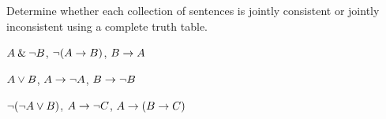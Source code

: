 \problempart
\label{pr.TT.consistent2}
Determine whether each collection of sentences is jointly consistent or jointly inconsistent using a complete truth table.
\begin{earg}
\item $A \mathbin{\&} \neg B$, $\neg(A \rightarrow B)$, $B \rightarrow A$\vspace{.5ex} %


\item $A \vee B$, $A \rightarrow \neg A$, $B \rightarrow \neg B$ \vspace{.5ex}%


\item $\neg(\neg A \vee B) $, $A \rightarrow \neg C$, $A \rightarrow (B \rightarrow C)$\vspace{.5ex} %


\end{earg}

